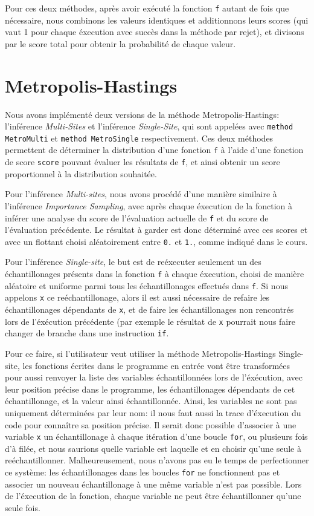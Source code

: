 \documentclass[svgnames]{article}
\begin{document}
Pour ces deux méthodes, après avoir exécuté la fonction \texttt{f} autant de fois que nécessaire, nous combinons les valeurs identiques et additionnons leurs scores (qui vaut 1 pour chaque éxecution avec succès dans la méthode par rejet), et divisons par le score total pour obtenir la probabilité de chaque valeur.

\section{Metropolis-Hastings}

Nous avons implémenté deux versions de la méthode Metropolis-Hastings: l'inférence \emph{Multi-Sites} et l'inférence \emph{Single-Site}, qui sont appelées avec \lstinline{method MetroMulti}  et \lstinline{method MetroSingle} respectivement. Ces deux méthodes permettent de déterminer la distribution d'une fonction \verb|f| à l'aide d'une fonction de score \verb|score| pouvant évaluer les résultats de \verb|f|, et ainsi obtenir un score proportionnel à la distribution souhaitée.

Pour l'inférence \emph{Multi-sites}, nous avons procédé d'une manière similaire à l'inférence \emph{Importance Sampling}, avec après chaque éxecution de la fonction à inférer une analyse du score de l'évaluation actuelle de \verb|f| et du score de l'évaluation précédente. Le résultat à garder est donc déterminé avec ces scores et avec un flottant choisi aléatoirement entre \verb|0.| et \verb|1.|, comme indiqué dans le cours.

Pour l'inférence \emph{Single-site}, le but est de reéxecuter seulement un des échantillonages présents dans la fonction \verb|f| à chaque éxecution, choisi de manière aléatoire et uniforme parmi tous les échantillonages effectués dans \verb|f|. Si nous appelons \verb|x| ce reéchantillonage, alors il est aussi nécessaire de refaire les échantillonages dépendants de \texttt x, et de faire les échantillonages non rencontrés lors de l'éxécution précédente (par exemple le résultat de \texttt x pourrait nous faire changer de branche dans une instruction \verb|if|.

Pour ce faire, si l'utilisateur veut utiliser la méthode Metropolis-Hastings Single-site, les fonctions écrites dans le programme en entrée vont être transformées pour aussi renvoyer la liste des variables échantillonnées lors de l'éxécution, avec leur position précise dans le programme, les échantillonages dépendants de cet échantillonage, et la valeur ainsi échantillonnée. Ainsi, les variables ne sont pas uniquement déterminées par leur nom: il nous faut aussi la trace d'éxecution du code pour connaître sa position précise. Il serait donc possible d'associer à une variable \verb|x| un échantillonage à chaque itération d'une boucle \verb|for|, ou plusieurs fois d'à filée, et nous saurions quelle variable est laquelle et en choisir qu'une seule à reéchantillonner. Malheureusement, nous n'avons pas eu le temps de perfectionner ce système: les échantillonages dans les boucles \verb|for| ne fonctionnent pas et associer un nouveau échantillonage à une même variable n'est pas possible. Lors de l'éxecution de la fonction, chaque variable ne peut être échantillonner qu'une seule fois.
\end{document}
